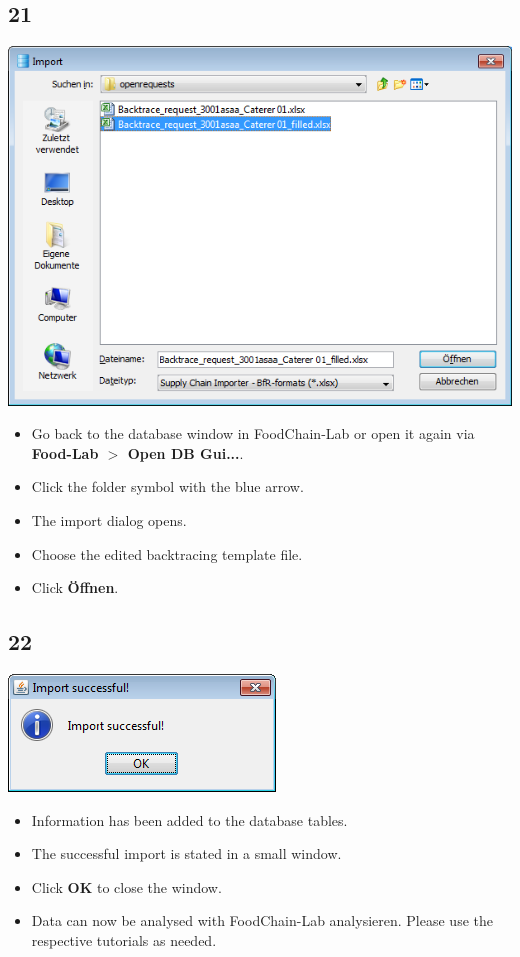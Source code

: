 \documentclass{beamer}
\begin{document}
\subsection{21}
\begin{frame}
	\begin{center}
  		\includegraphics[height=0.6\textheight]{21.png}
	\end{center}
	\begin{itemize}
		\item Go back to the database window in FoodChain-Lab or open it again via \textbf{Food-Lab $>$ Open DB Gui...}.
		\item Click the folder symbol with the blue arrow.
		\item The import dialog opens.
		\item Choose the edited backtracing template file.
		\item Click \textbf{Öffnen}.
	\end{itemize}
\end{frame}

\subsection{22}
\begin{frame}
	\begin{center}
  		\includegraphics[height=0.3\textheight]{22.png}
	\end{center}
	\begin{itemize}
		\item Information has been added to the database tables.
		\item The successful import is stated in a small window.
		\item Click \textbf{OK} to close the window.
		\item Data can now be analysed with FoodChain-Lab analysieren. Please use the respective tutorials as needed.
	\end{itemize}
\end{frame}
\end{document}
